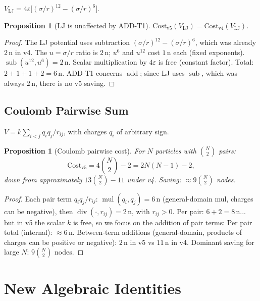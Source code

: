 \documentclass[12pt,a4paper]{article}
\newtheorem{proposition}[theorem]{Proposition}
\theoremstyle{definition}
\newcommand{\divop}{\operatorname{div}}
\newcommand{\mulop}{\operatorname{mul}}
\newcommand{\subop}{\operatorname{sub}}
\newcommand{\addop}{\operatorname{add}}
\newcommand{\Cost}{\mathrm{Cost}}
\begin{document}
$V_{\mathrm{LJ}} = 4\varepsilon\bigl[(\sigma/r)^{12} - (\sigma/r)^6\bigr]$.

\begin{proposition}[LJ is unaffected by ADD-T1]
$\Cost_{\mathrm{v5}}(V_{\mathrm{LJ}}) = \Cost_{\mathrm{v4}}(V_{\mathrm{LJ}})$.
\end{proposition}

\begin{proof}
The LJ potential uses subtraction $(\sigma/r)^{12} - (\sigma/r)^6$, which was
already $2\,\text{n}$ in v4.  The $u = \sigma/r$ ratio is $2\,\text{n}$;
$u^6$ and $u^{12}$ cost $1\,\text{n}$ each (fixed exponents).
$\subop(u^{12}, u^6) = 2\,\text{n}$.  Scalar multiplication by $4\varepsilon$
is free (constant factor).  Total: $2 + 1 + 1 + 2 = 6\,\text{n}$.
ADD-T1 concerns $\addop$; since LJ uses $\subop$, which was always $2\,\text{n}$,
there is no v5 saving.
\end{proof}

\subsection{Coulomb Pairwise Sum}

$V = k \sum_{i < j} q_i q_j / r_{ij}$, with charges $q_i$ of arbitrary sign.

\begin{proposition}[Coulomb pairwise cost]
For $N$ particles with $\binom{N}{2}$ pairs:
\[
  \Cost_{\mathrm{v5}} = 4\binom{N}{2} - 2 = 2N(N-1) - 2,
\]
down from approximately $13\binom{N}{2} - 11$ under v4.
Saving: $\approx 9\binom{N}{2}$ nodes.
\end{proposition}

\begin{proof}
Each pair term $q_i q_j / r_{ij}$: $\mulop(q_i, q_j) = 6\,\text{n}$ (general-domain
mul, charges can be negative), then $\divop(\cdot, r_{ij}) = 2\,\text{n}$,
with $r_{ij} > 0$.  Per pair: $6 + 2 = 8\,\text{n}$... but in v5 the scalar $k$
is free, so we focus on the addition of pair terms:
Per pair total (internal): $\approx 6\,\text{n}$.  Between-term additions
(general-domain, products of charges can be positive or negative): $2\,\text{n}$
in v5 vs $11\,\text{n}$ in v4.
Dominant saving for large $N$: $9 \binom{N}{2}$ nodes.
\end{proof}

\section{New Algebraic Identities}
\label{sec:identities}
\end{document}
